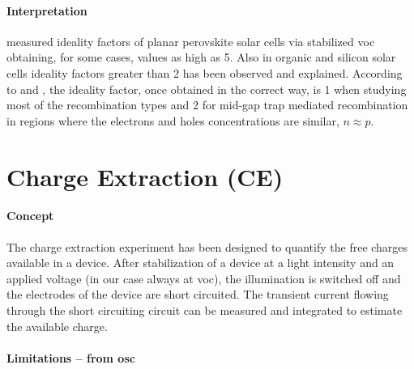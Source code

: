 		\paragraph{Interpretation} %
		 measured ideality factors of planar perovskite solar cells via stabilized \gls{voc} obtaining, for some cases, values as high as 5. Also in organic \cite{Kirchartz2011,Kirchartz2012} and silicon solar cells \cite{Breitenstein2006} ideality factors greater than 2 has been observed and explained. According to  and , the ideality factor, once obtained in the correct way, is 1 when studying most of the recombination types and 2 for mid-gap trap mediated recombination in regions where the electrons and holes concentrations are similar, $n \approx p$.

\section{Charge Extraction (CE)}

	\paragraph{Concept} The charge extraction experiment has been designed\cite{Duffy2000} to quantify the free charges available in a device. After stabilization of a device at a light intensity and an applied voltage (in our case always at \gls{voc}), the illumination is switched off and the electrodes of the device are short circuited. The transient current flowing through the short circuiting circuit can be measured and integrated to estimate the available charge.
	
	\paragraph{Limitations -- from \gls{osc}}
	
